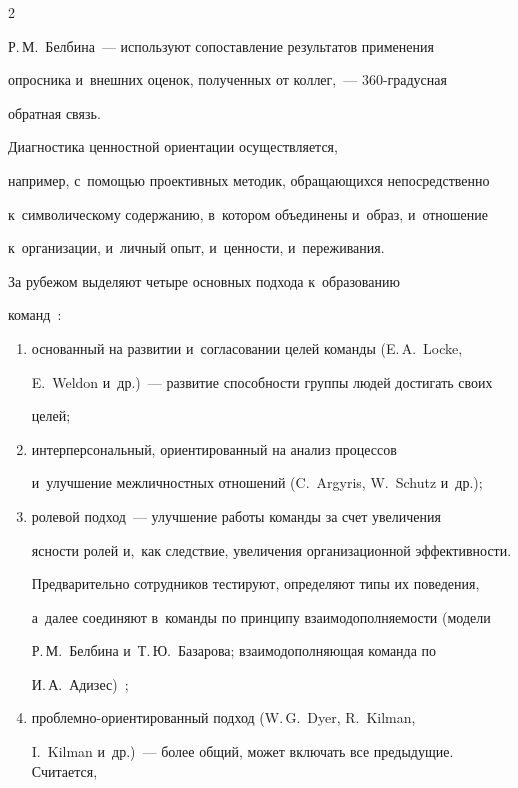 \begin{multicols}{2}
\begin{enumerate}[(1)]
Р.\,М.~Белбина~--- используют со\-по\-став\-ле\-ние результатов применения 

опросника и~внеш\-них оценок, полученных от коллег,~--- 360-гра\-дус\-ная 

об\-рат\-ная связь.

\end{enumerate}

 Диагностика ценностной ориентации осуществляется, 

например, с~по\-мощью проективных методик, об\-ра\-ща\-ющих\-ся непосредственно 

к~символическому содержанию, в~котором объединены и~образ, и~отношение 

к~организации, и~личный опыт, и~ценности, и~переживания. 

  

  За рубежом выделяют четыре основных подхода к~образованию 

команд~\cite{31-r}:

  \begin{enumerate}[(1)]

  \item  основанный на развитии и~согласовании целей команды (E.\,A.~Locke, 

E.~Weldon и~др.)~--- развитие спо\-соб\-ности группы людей достигать своих 

целей;

  \item интерперсональный, ориентированный на анализ процессов 

  и~улучшение межличностных отношений (C.~Argyris, W.~Schutz и~др.); 

  \item ролевой подход~--- улучшение работы команды за счет увеличения 

яс\-ности ролей и,~как следствие, увеличения организационной эф\-фек\-тив\-ности. 

Пред\-ва\-ри\-тел\-ьно сотрудников тес\-ти\-ру\-ют, определяют типы их поведения, 

а~далее со\-еди\-ня\-ют в~команды по принципу взаи\-мо\-до\-пол\-ня\-емости (модели 

Р.\,М.~Белбина и~Т.\,Ю.~Базарова; взаи\-мо\-до\-пол\-ня\-ющая команда по 

И.\,А.~Адизес)~\cite{3-r, 32-r};

  \item проблемно-ори\-ен\-ти\-ро\-ван\-ный подход (W.\,G.~Dyer, R.~Kilman, 

I.~Kilman и~др.)~--- более общий, может вклю\-чать все предыду\-щие. Считается, 


\end{enumerate}
\end{multicols}
